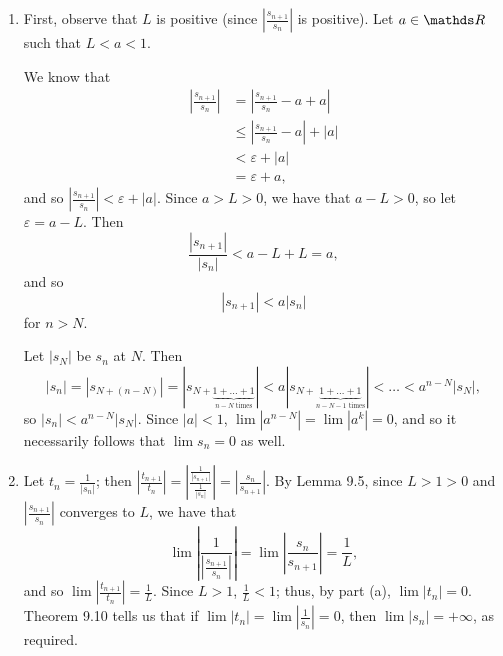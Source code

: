\documentclass{homework}
\begin{document}
\begin{solution}
  \begin{enumerate}[label=(\alph*)]
    \item First, observe that $L$ is positive (since $\left| \frac{s_{n+1}}{s_n} \right| $ is
      positive). Let $a\in \R$ such that $L<a<1$.

      We know that
      \begin{align*}
        \left| \frac{s_{n+1}}{s_n} \right| &= \left| \frac{s_{n+1}}{s_n} -a+a\right| \\
                                           &\le \left| \frac{s_{n+1}}{s_n}-a \right| +\left| a
                                           \right| \\
                                           &< \varepsilon+\left| a \right| \\
                                           &= \varepsilon+a
     ,\end{align*}
     and so $\left| \frac{s_{n+1}}{s_n} \right| <\varepsilon+\left| a \right| $. Since $a>L>0$, we
     have that $a-L>0$, so let $\varepsilon=a-L$. Then \[
       \frac{\left| s_{n+1} \right| }{\left| s_n \right| } < a-L+L=a
     ,\] and so \[
     \left| s_{n+1} \right| < a\left| s_n \right| 
     \] for $n>N$.

     Let $\left| s_N \right| $ be $s_n$ at $N$. Then \[
       \left| s_n \right| =\left| s_{N+(n-N)} \right| =\left|
       s_{N+\underbrace{1+\ldots+1}_\text{$n-N$ times}} \right|  < a\left|
       s_{N+\underbrace{1+\ldots+1}_\text{$n-N-1$ times}} \right| <\ldots<a^{n-N}\left| s_N \right| 
     ,\] so $\left| s_n \right| <a^{n-N}\left| s_N \right| $. Since $\left| a \right| <1$,
     $\lim{\left| a^{n-N} \right| }=\lim{\left| a^{k} \right|}=0$, and so it necessarily follows
     that $\lim{s_n}=0$ as well.


   \item Let $t_n=\frac{1}{\left| s_n \right| }$; then $\left| \frac{t_{n+1}}{t_n} \right|=\left|
     \frac{\frac{1}{\left| s_{n+1} \right| }}{\frac{1}{\left| s_n \right| }} \right| =\left|
     \frac{s_n}{s_{n+1}} \right|$. By Lemma 9.5, since $L>1>0$ and $\left| \frac{s_{n+1}}{s_n}
     \right| $ converges to $L$, we have that \[
       \lim{\left| \frac{1}{\left| \frac{s_{n+1}}{s_n} \right|} \right| }=\lim{\left|
       \frac{s_n}{s_{n+1}} \right| }=\frac{1}{L}
     ,\] and so $\lim{\left| \frac{t_{n+1}}{t_n} \right| }=\frac{1}{L}$. Since $L>1$,
     $\frac{1}{L}<1$; thus, by part (a), $\lim{\left| t_n \right| }=0$. Theorem 9.10 tells us that
     if $\lim{\left| t_n \right| }=\lim{\left| \frac{1}{s_n} \right| }=0$, then $\lim{\left| s_n
     \right| }=+\infty$, as required.
  \end{enumerate}
\end{solution}
\end{document}
